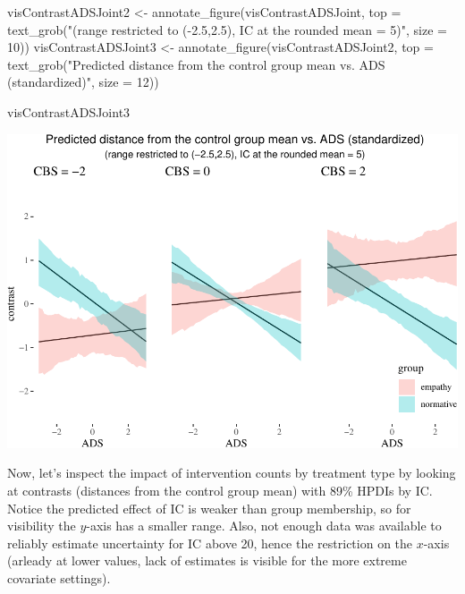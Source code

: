 \documentclass[
  10pt,
  dvipsnames,enabledeprecatedfontcommands]{scrartcl}
\newenvironment{Shaded}{\begin{snugshade}}{\end{snugshade}}
\newcommand{\AttributeTok}[1]{\textcolor[rgb]{0.77,0.63,0.00}{#1}}
\newcommand{\DecValTok}[1]{\textcolor[rgb]{0.00,0.00,0.81}{#1}}
\newcommand{\FunctionTok}[1]{\textcolor[rgb]{0.00,0.00,0.00}{#1}}
\newcommand{\NormalTok}[1]{#1}
\newcommand{\OtherTok}[1]{\textcolor[rgb]{0.56,0.35,0.01}{#1}}
\newcommand{\StringTok}[1]{\textcolor[rgb]{0.31,0.60,0.02}{#1}}
\begin{document}
\begin{Shaded}
\begin{Highlighting}[]
\NormalTok{visContrastADSJoint2 }\OtherTok{\textless{}{-}} \FunctionTok{annotate\_figure}\NormalTok{(visContrastADSJoint, }
\AttributeTok{top =} \FunctionTok{text\_grob}\NormalTok{(}\StringTok{"(range restricted to ({-}2.5,2.5), IC at the rounded mean = 5)"}\NormalTok{,}
                                                        \AttributeTok{size =} \DecValTok{10}\NormalTok{))}
\NormalTok{visContrastADSJoint3 }\OtherTok{\textless{}{-}} \FunctionTok{annotate\_figure}\NormalTok{(visContrastADSJoint2, }
\AttributeTok{top =} \FunctionTok{text\_grob}\NormalTok{(}\StringTok{"Predicted distance from the control group mean vs. ADS (standardized)"}\NormalTok{,}
                                                        \AttributeTok{size =} \DecValTok{12}\NormalTok{))}

\NormalTok{visContrastADSJoint3}
\end{Highlighting}
\end{Shaded}

\begin{center}\includegraphics[width=1\linewidth]{bayesianReport3_files/figure-latex/unnamed-chunk-14-1} \end{center}
\normalsize

Now, let's inspect the impact of intervention counts by treatment type
by looking at contrasts (distances from the control group mean) with
89\% HPDIs by IC. Notice the predicted effect of \textsf{IC} is weaker
than group membership, so for visibility the \(y\)-axis has a smaller
range. Also, not enough data was available to reliably estimate
uncertainty for \textsf{IC} above 20, hence the restriction on the
\(x\)-axis (arleady at lower values, lack of estimates is visible for
the more extreme covariate settings).
\end{document}

